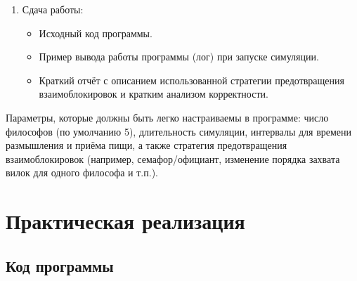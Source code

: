 \documentclass[a4paper, 14pt]{extarticle}
\begin{document}
\begin{enumerate}
\begin{itemize}
            \item В ходе работы программа должна логировать события: метка времени (мс от старта), идентификатор философа и его состояние.
            \item Формат вывода — табличный лог, показывающий состояние каждого философа во времени (пример: t(ms) | P00 P01 ...).
        \end{itemize}
    \item Сдача работы:
        \begin{itemize}
            \item Исходный код программы.
            \item Пример вывода работы программы (лог) при запуске симуляции.
            \item Краткий отчёт с описанием использованной стратегии предотвращения взаимоблокировок и кратким анализом корректности.
        \end{itemize}
\end{enumerate}

Параметры, которые должны быть легко настраиваемы в программе: число философов (по умолчанию 5), длительность симуляции, интервалы для времени размышления и приёма пищи, а также стратегия предотвращения взаимоблокировок (например, семафор/официант, изменение порядка захвата вилок для одного философа и т.п.).

\section*{Практическая реализация}\label{Sect::implementation}

\subsection*{Код программы}\label{Subsect::source_code}
\end{document}
